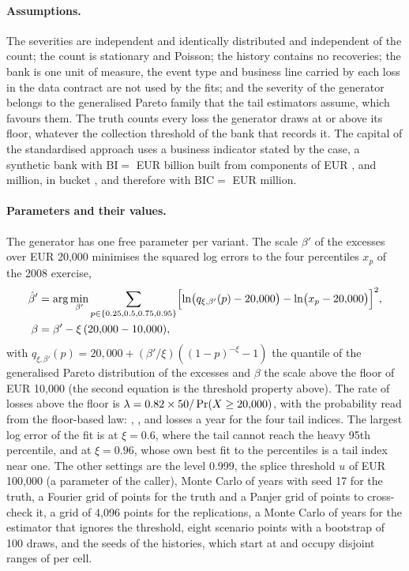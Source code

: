 \paragraph{Assumptions.} The severities are independent and identically distributed and independent of the count; the count is
stationary and Poisson; the history contains no recoveries; the bank is one unit of measure, the event type and
business line carried by each loss in the data contract are not used by the fits; and the severity of the generator belongs to the
generalised Pareto family that the tail estimators assume, which favours them. The truth counts every loss the generator draws at or above
its floor, whatever the collection threshold of the bank that records it. The capital of the standardised approach uses a
business indicator stated by the case, a synthetic bank with $\mathrm{BI}=$ EUR \opBi{} billion built from components of EUR \opBiIldc{}, \opBiSc{} and \opBiFc{}
million, in bucket \opBucket{}, and therefore with $\mathrm{BIC}=$ EUR \opBic{} million.

\paragraph{Parameters and their values.} The generator has one free parameter per variant. The scale $\beta'$ of the excesses over EUR 20,000 minimises the
squared log errors to the four percentiles $x_p$ of the 2008 exercise,
\begin{equation}
\begin{aligned}
\hat\beta'&=\arg\min_{\beta'}\sum_{p\in\{0.25,0.5,0.75,0.95\}}\Bigl[\ln\bigl(q_{\xi,\beta'}(p)-20{,}000\bigr)-\ln\bigl(x_p-20{,}000\bigr)\Bigr]^2,\\
\beta&=\beta'-\xi\,(20{,}000-10{,}000),
\end{aligned}
\label{eq:op-calibration}
\end{equation}
with $q_{\xi,\beta'}(p)=20{,}000+(\beta'/\xi)((1-p)^{-\xi}-1)$ the quantile of the generalised Pareto distribution of the excesses
and $\beta$ the scale above the floor of EUR 10,000 (the second equation is the threshold property above). The rate of losses above the floor
is $\lambda=0.82{}\times50{}/\Pr(X\ge20{,}000)$, with the probability read from the floor-based law: \opLamA{}, \opLamB{}, \opLamC{} and \opLamD{} losses a
year for the four tail indices. The largest log error of the fit is \opCalErrA{} at $\xi=0.6$, where the tail cannot reach the heavy 95th percentile, and
\opCalErrC{} at $\xi=0.96$, whose own best fit to the percentiles is a tail index near one. The other settings are the level 0.999, the
splice threshold $u$ of EUR 100,000 (a parameter of the caller), Monte Carlo of \opTruthMc{} years with seed 17 for the truth, a Fourier grid of
\opFftPoints{} points for the truth and a Panjer grid of \opPanjerPoints{} points to cross-check it, a grid of 4,096 points for the
replications, a Monte Carlo of \opRepMc{} years for the estimator that ignores the threshold, eight scenario points with a bootstrap of 100 draws, and
the seeds of the histories, which start at \opSeedBase{} and occupy disjoint ranges of \opNRep{} per cell.

